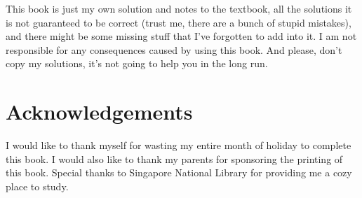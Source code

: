 \documentclass{report}
\begin{document}
This book is just my own solution and notes to the textbook, all the solutions
it is not guaranteed to be correct (trust me, there are a bunch of stupid
mistakes), and there might be some missing stuff that I've forgotten to add
into it. I am not responsible for any consequences caused by using this book.
And please, don't copy my solutions, it's not going to help you in the long
run.

\section*{Acknowledgements}

I would like to thank myself for wasting my entire month of holiday to complete
this book. I would also like to thank my parents for sponsoring the printing of
this book. Special thanks to Singapore National Library for providing me a cozy
place to study.

\singlespacing{}

\doublespacing{}
\tableofcontents
\singlespacing{}
\newpage
\end{document}
